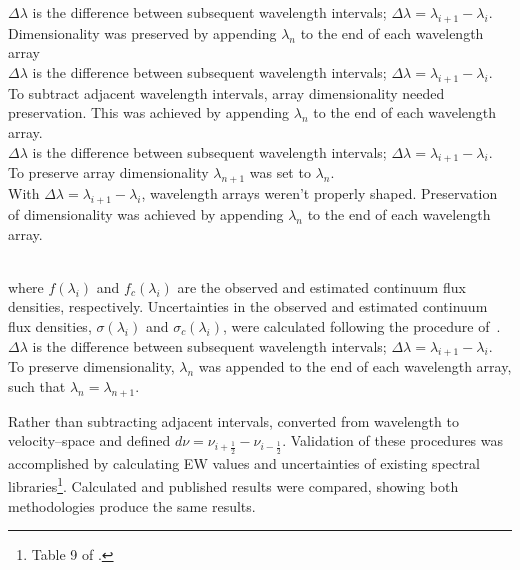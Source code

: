 	 $\Delta\lambda$ is the difference between subsequent 
	wavelength intervals; $\Delta\lambda = \lambda_{i+1} - \lambda_{i}$.   
	Dimensionality was preserved by appending $\lambda_{n}$ to the end 
	of each wavelength array\\

	 $\Delta\lambda$ is the difference between subsequent 
	wavelength intervals; $\Delta\lambda = \lambda_{i+1} - \lambda_{i}$.   
	To subtract adjacent wavelength intervals, array dimensionality needed 
	preservation.  This was achieved by appending $\lambda_{n}$ to the end 
	of each wavelength array.\\

	 $\Delta\lambda$ is the difference between subsequent 
	wavelength intervals; $\Delta\lambda = \lambda_{i+1} - \lambda_{i}$.   
	To preserve array dimensionality $\lambda_{n+1}$ was set to $\lambda_{n}$.\\

	 With $\Delta\lambda = \lambda_{i+1} - \lambda_{i}$, wavelength 
	arrays weren't properly shaped.  Preservation of dimensionality was achieved 
	by appending $\lambda_{n}$ to the end of each wavelength array.\\
\fi

\\
\noindent where $f(\lambda_{i})$ and $f_{c}(\lambda_{i})$ are the observed 
and estimated continuum flux densities, respectively.  Uncertainties in the 
observed and estimated continuum flux densities, $\sigma(\lambda_{i})$ and 
$\sigma_{c}(\lambda_{i})$, were calculated following the procedure 
of~\cite{Sembach_1992}.  $\Delta\lambda$ is the difference between subsequent 
wavelength intervals; $\Delta\lambda = \lambda_{i+1} - \lambda_{i}$.   
To preserve dimensionality, $\lambda_{n}$ was appended to the end of each 
wavelength array, such that $\lambda_{n} = \lambda_{n+1}$.

\indent Rather than subtracting adjacent intervals, 
\cite{Sembach_1992} converted from wavelength to velocity--space and defined 
$d\nu = \nu_{i+\frac{1}{2}} - \nu_{i-\frac{1}{2}}$.  
Validation of these procedures was accomplished by calculating EW values and 
uncertainties of existing spectral libraries\footnote{Table 9 of \cite{Rayner_2009}.}.  
Calculated and published results were compared, showing both methodologies produce 
the same results.  



